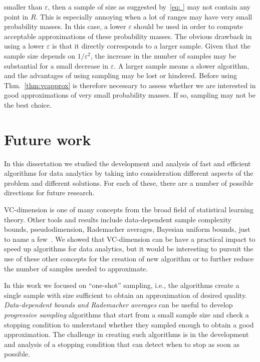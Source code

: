 \begin{itemize}
    smaller than $\varepsilon$, then a sample of size as suggested by~\eqref{eq:
    } may not contain any point in $R$. This is especially annoying when a lot
    of ranges may have very small probability masses. In this case, a lower
    $\varepsilon$ should be used in order to compute acceptable approximations
    of these probability masses. The obvious drawback in using a lower
    $\varepsilon$ is that it directly corresponds to a larger sample. Given that
    the sample size depends on $1/\varepsilon^2$, the increase in the number of
    samples may be substantial for a small decrease in $\varepsilon$. A larger
    sample means a slower algorithm, and the advantages of using sampling may be
    lost or hindered. Before using Thm.~\ref{thm:vcapprox} is therefore
    necessary to assess whether we are interested in good approximations of very
    small probability masses. If so, sampling may not be the best choice.
\end{itemize}

\section*{Future work} 
In this dissertation we studied the development and analysis of fast and
efficient algorithms for data analytics by taking into consideration different
aspects of the problem and different solutions. For each of these, there are a
number of possible directions for future research.

VC-dimension is one of many concepts from the broad field of statistical
learning theory. Other tools and results include data-dependent sample
complexity bounds, pseudodimension, Rademacher averages, Bayesian uniform
bounds, just to name a few~\citep{BoucheronBL05,AnthonyB99,DevroyeGL96}. We
showed that VC-dimension can be have a practical impact to speed up algorithms
for data analytics, but it would be interesting to pursuit the use of these
other concepts for the creation of new algorithm or to further reduce the number
of samples needed to approximate. 

In this work we focused on ``one-shot'' sampling, i.e., the algorithms create a
single sample with size sufficient to obtain an approximation of desired
quality. \emph{Data-dependent bounds and Rademacher averages} can be
useful to develop \emph{progressive sampling} algorithms that start from a small
sample size and check a stopping condition to understand whether they sampled
enough to obtain a good approximation. The challenge in creating such algorithms
is in the development and analysis of a stopping condition that can detect when
to stop as soon as possible.  

